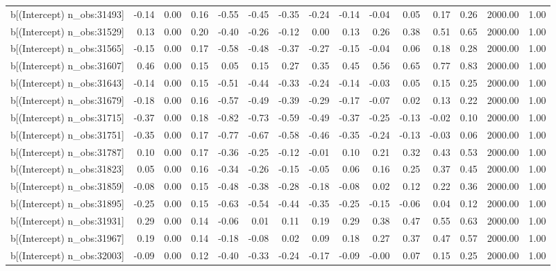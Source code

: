 \begin{table}[ht]
\begin{tabular}{rrrrrrrrrrrrrrr}
  b[(Intercept) n\_obs:31493] & -0.14 & 0.00 & 0.16 & -0.55 & -0.45 & -0.35 & -0.24 & -0.14 & -0.04 & 0.05 & 0.17 & 0.26 & 2000.00 & 1.00 \\ 
  b[(Intercept) n\_obs:31529] & 0.13 & 0.00 & 0.20 & -0.40 & -0.26 & -0.12 & 0.00 & 0.13 & 0.26 & 0.38 & 0.51 & 0.65 & 2000.00 & 1.00 \\ 
  b[(Intercept) n\_obs:31565] & -0.15 & 0.00 & 0.17 & -0.58 & -0.48 & -0.37 & -0.27 & -0.15 & -0.04 & 0.06 & 0.18 & 0.28 & 2000.00 & 1.00 \\ 
  b[(Intercept) n\_obs:31607] & 0.46 & 0.00 & 0.15 & 0.05 & 0.15 & 0.27 & 0.35 & 0.45 & 0.56 & 0.65 & 0.77 & 0.83 & 2000.00 & 1.00 \\ 
  b[(Intercept) n\_obs:31643] & -0.14 & 0.00 & 0.15 & -0.51 & -0.44 & -0.33 & -0.24 & -0.14 & -0.03 & 0.05 & 0.15 & 0.25 & 2000.00 & 1.00 \\ 
  b[(Intercept) n\_obs:31679] & -0.18 & 0.00 & 0.16 & -0.57 & -0.49 & -0.39 & -0.29 & -0.17 & -0.07 & 0.02 & 0.13 & 0.22 & 2000.00 & 1.00 \\ 
  b[(Intercept) n\_obs:31715] & -0.37 & 0.00 & 0.18 & -0.82 & -0.73 & -0.59 & -0.49 & -0.37 & -0.25 & -0.13 & -0.02 & 0.10 & 2000.00 & 1.00 \\ 
  b[(Intercept) n\_obs:31751] & -0.35 & 0.00 & 0.17 & -0.77 & -0.67 & -0.58 & -0.46 & -0.35 & -0.24 & -0.13 & -0.03 & 0.06 & 2000.00 & 1.00 \\ 
  b[(Intercept) n\_obs:31787] & 0.10 & 0.00 & 0.17 & -0.36 & -0.25 & -0.12 & -0.01 & 0.10 & 0.21 & 0.32 & 0.43 & 0.53 & 2000.00 & 1.00 \\ 
  b[(Intercept) n\_obs:31823] & 0.05 & 0.00 & 0.16 & -0.34 & -0.26 & -0.15 & -0.05 & 0.06 & 0.16 & 0.25 & 0.37 & 0.45 & 2000.00 & 1.00 \\ 
  b[(Intercept) n\_obs:31859] & -0.08 & 0.00 & 0.15 & -0.48 & -0.38 & -0.28 & -0.18 & -0.08 & 0.02 & 0.12 & 0.22 & 0.36 & 2000.00 & 1.00 \\ 
  b[(Intercept) n\_obs:31895] & -0.25 & 0.00 & 0.15 & -0.63 & -0.54 & -0.44 & -0.35 & -0.25 & -0.15 & -0.06 & 0.04 & 0.12 & 2000.00 & 1.00 \\ 
  b[(Intercept) n\_obs:31931] & 0.29 & 0.00 & 0.14 & -0.06 & 0.01 & 0.11 & 0.19 & 0.29 & 0.38 & 0.47 & 0.55 & 0.63 & 2000.00 & 1.00 \\ 
  b[(Intercept) n\_obs:31967] & 0.19 & 0.00 & 0.14 & -0.18 & -0.08 & 0.02 & 0.09 & 0.18 & 0.27 & 0.37 & 0.47 & 0.57 & 2000.00 & 1.00 \\ 
  b[(Intercept) n\_obs:32003] & -0.09 & 0.00 & 0.12 & -0.40 & -0.33 & -0.24 & -0.17 & -0.09 & -0.00 & 0.07 & 0.15 & 0.25 & 2000.00 & 1.00 \\ 

\end{tabular}
\end{table}
